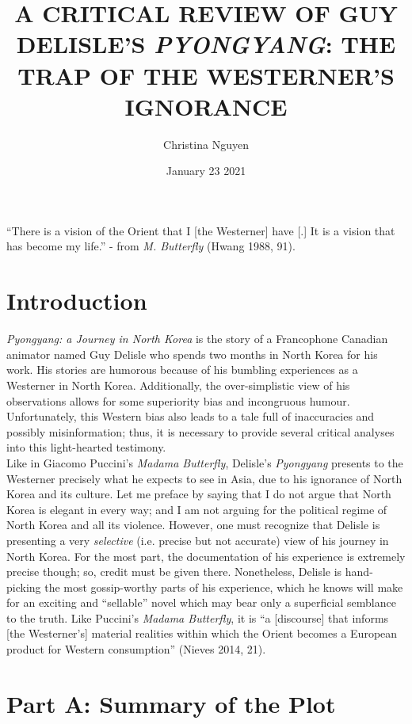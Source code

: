 \documentclass{article}
\title{A CRITICAL REVIEW OF GUY DELISLE’S \textit{PYONGYANG}:
THE TRAP OF THE WESTERNER’S IGNORANCE}
\author{Christina Nguyen }
\date{January 23 2021}
\begin{document}
\maketitle


“There is a vision of the Orient that I [the Westerner] have [.] It is a vision that has become my life.”   
\newline - from \textit{M.  Butterfly} (Hwang 1988, 91).

\section{Introduction}

\qquad \textit{Pyongyang: a Journey in North Korea} is the story of a Francophone Canadian animator named Guy Delisle who spends two months in North Korea for his work. His stories are humorous because of his bumbling experiences as a Westerner in North Korea. Additionally, the over-simplistic view of his observations allows for some superiority bias and incongruous humour. Unfortunately, this Western bias also leads to a tale full of inaccuracies and possibly misinformation; thus, it is necessary to provide several critical analyses into this light-hearted testimony. \\

 \newline \qquad Like in Giacomo Puccini’s \textit{Madama Butterfly}, Delisle’s \textit{Pyongyang} presents to the Westerner precisely what he expects to see in Asia, due to his ignorance of North Korea and its culture. Let me preface by saying that I do not argue that North Korea is elegant in every way; and I am not arguing for the political regime of North Korea and all its violence. However, one must recognize that Delisle is presenting a very \textit{selective} (i.e. precise but not accurate) view of his journey in North Korea. For the most part, the documentation of his experience is extremely precise though; so, credit must be given there. Nonetheless, Delisle is hand-picking the most gossip-worthy parts of his experience, which he knows will make for an exciting and “sellable” novel which may bear only a superficial semblance to the truth. Like Puccini’s \textit{Madama Butterfly}, it is “a [discourse] that informs [the Westerner’s] material realities within which the Orient becomes a European product for Western consumption” (Nieves 2014, 21). \\

\section{Part A: Summary of the Plot}
\end{document}

